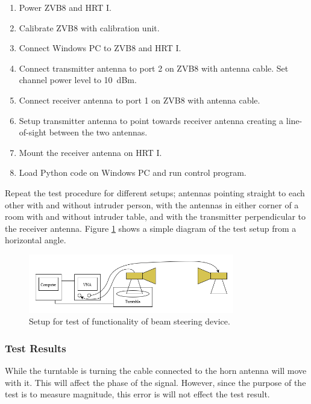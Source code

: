\begin{enumerate}
    \item Power ZVB8 and HRT I. 
    \item Calibrate ZVB8 with calibration unit.
    \item Connect Windows PC to ZVB8 and HRT I.
    \item Connect transmitter antenna to port 2 on ZVB8 with antenna cable. Set channel power level to \SI{10}{dBm}.
    \item Connect receiver antenna to port 1 on ZVB8 with antenna cable.
    \item Setup transmitter antenna to point towards receiver antenna creating a line-of-sight between the two antennas. 
    \item Mount the receiver antenna on HRT I.
    \item Load Python code on Windows PC and run control program.
\end{enumerate}

Repeat the test procedure for different setups; antennas pointing straight to each other with and without intruder person, with the antennas in either corner of a room with and without intruder table, and with the transmitter perpendicular to the receiver antenna. Figure \ref{fig:experiment-setup} shows a simple diagram of the test setup from a horizontal angle.

\begin{figure}[H]
    \centering
    \includegraphics[width=0.8\textwidth]{figures/accept_test_setup.png}
    \caption{Setup for test of functionality of beam steering device.} \label{fig:experiment-setup}
\end{figure}

\subsubsection{Test Results}


While the turntable is turning the cable connected to the horn antenna will move with it. This will affect the phase of the signal. However, since the purpose of the test is to measure magnitude, this error is will not effect the test result. 